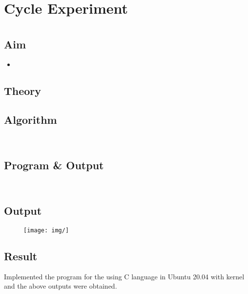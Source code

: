 \section*{Cycle  Experiment }

\section{\Large{}}

\subsection{Aim}
\large 
\begin{itemize}
    \item 
\end{itemize}

\subsection{Theory}

\subsection{Algorithm}
\begin{verbatim}
    
\end{verbatim}

\subsection{Program \& Output}
\begin{verbatim}
    
\end{verbatim}

\subsection{Output}
\begin{figure}[h]
            \centering
            \texttt{[image: img/]}
\end{figure}

\subsection{Result}
Implemented the program for the 
using C language in Ubuntu 20.04 with kernel and the above outputs were obtained.

